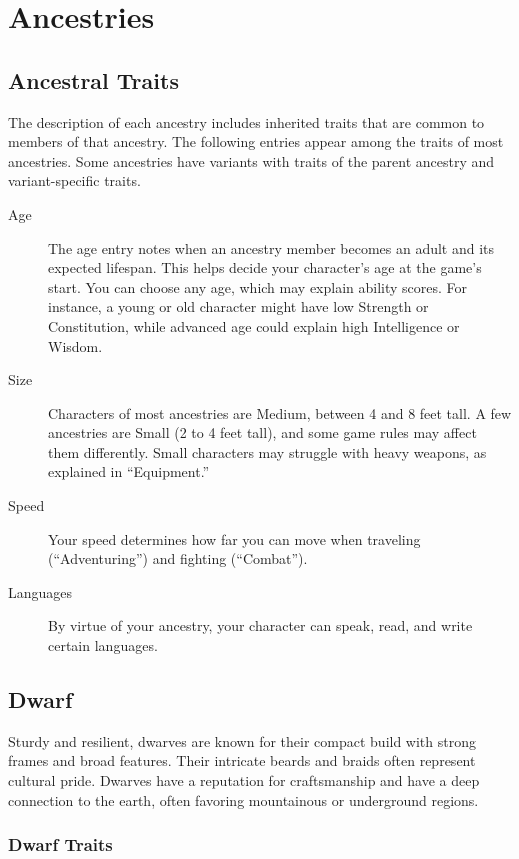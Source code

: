 \section{Ancestries}\label{_ancestries}

\subsection{Ancestral Traits}\label{_ancestral_traits}

The description of each ancestry includes inherited traits that are
common to members of that ancestry. The following entries appear among
the traits of most ancestries. Some ancestries have variants with traits
of the parent ancestry and variant-specific traits.

\begin{description}
\item[Age]
The age entry notes when an ancestry member becomes an adult and its
expected lifespan. This helps decide your character's age at the game's
start. You can choose any age, which may explain ability scores. For
instance, a young or old character might have low Strength or
Constitution, while advanced age could explain high Intelligence or
Wisdom.
\item[Size]
Characters of most ancestries are Medium, between 4 and 8 feet tall. A
few ancestries are Small (2 to 4 feet tall), and some game rules may
affect them differently. Small characters may struggle with heavy
weapons, as explained in ``Equipment.''
\item[Speed]
Your speed determines how far you can move when traveling
(``Adventuring'') and fighting (``Combat'').
\item[Languages]
By virtue of your ancestry, your character can speak, read, and write
certain languages.
\end{description}

\subsection{Dwarf}\label{_dwarf}

Sturdy and resilient, dwarves are known for their compact build with
strong frames and broad features. Their intricate beards and braids
often represent cultural pride. Dwarves have a reputation for
craftsmanship and have a deep connection to the earth, often favoring
mountainous or underground regions.

\subsubsection{Dwarf Traits}\label{_dwarf_traits}

